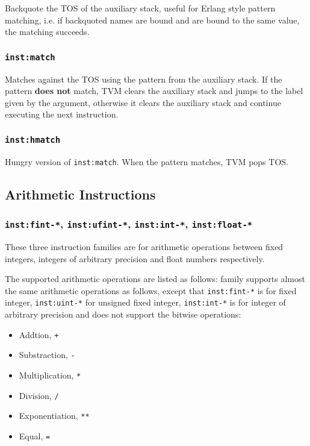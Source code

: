 \documentclass{article}
\newcommand{\inst}[1] {\texttt{inst:#1}}
\begin{document}
Backquote the TOS of the auxiliary stack, useful for Erlang style pattern matching, i.e. if backquoted names are bound and are bound to the same value, the matching succeeds.

\subsubsection{\inst{match}}

Matches against the TOS using the pattern from the auxiliary stack. If the pattern \textbf{does not} match, TVM clears the auxiliary stack and jumps to the label given by the argument, otherwise it clears the auxiliary stack and continue executing the next instruction.

\subsubsection{\inst{hmatch}}

Hungry version of \inst{match}. When the pattern matches, TVM pops TOS.

\subsection{Arithmetic Instructions}

\subsubsection{\inst{fint-*}, \inst{ufint-*}, \inst{int-*}, \inst{float-*}}

These three instruction families are for arithmetic operations between fixed integers, integers of arbitrary precision and float numbers respectively.

The supported arithmetic operations are listed as follows:
family supports almost the same arithmetic operations as follows, except that \inst{fint-*} is for fixed integer, \inst{uint-*} for unsigned fixed integer, \inst{int-*} is for integer of arbitrary precision and does not support the bitwise operations:
\begin{itemize}
\item Addtion, \texttt{+}
\item Substraction, \texttt{-}
\item Multiplication, \texttt{*}
\item Division, \texttt{/}
\item Exponentiation, \texttt{**}
\item Equal, \texttt{=}
\end{itemize}
\end{document}
